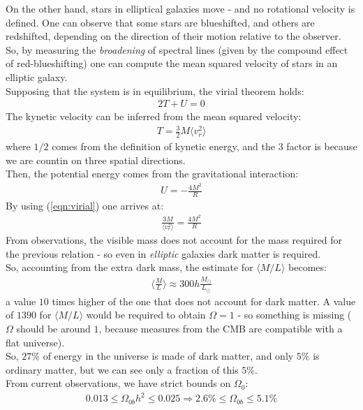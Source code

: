 \documentclass[../PhysUniverse.tex]{subfiles}
\begin{document}
On the other hand, stars in elliptical galaxies move  - and no rotational velocity is defined. One can observe that some stars are blueshifted, and others are redshifted, depending on the direction of their motion relative to the observer. So, by measuring the \textit{broadening} of spectral lines (given by the compound effect of red-blueshifting) one can compute the mean squared velocity of stars in an elliptic galaxy.\\
Supposing that the system is in equilibrium, the virial theorem holds:
\begin{align*}
2T + U = 0
\end{align*}
The kynetic velocity can be inferred from the mean squared velocity:
\begin{align}
T = \frac{3}{2}M \langle v_r^2\rangle
\label{eqn:virial}
\end{align}
where $1/2$ comes from the definition of kynetic energy, and the $3$ factor is because we are countin on three spatial directions.\\
Then, the potential energy comes from the gravitational interaction:
\begin{align*}
U = -\frac{4M^2}{R}
\end{align*}
By using (\ref{eqn:virial}) one arrives at:
\begin{align*}
\frac{3M}{\langle v_r^2\rangle} = \frac{4M^2}{R}
\end{align*}
From observations, the visible mass does not account for the mass required for the previous relation - so even in \textit{elliptic} galaxies dark matter is required.\\

So, accounting from the extra dark mass, the estimate for $\langle M/L\rangle $ becomes:
\begin{align*}
\langle \frac{M}{L}\rangle \approx 300h \frac{M_\odot}{L_\odot}
\end{align*}
a value $10$ times higher of the one that does not account for dark matter. A value of $1390$ for $\langle M/L\rangle$ would be required to obtain $\Omega=1$ - so something is missing ($\Omega$ should be around $1$, because measures from the CMB are compatible with a flat universe).\\

So, $27\%$ of energy in the universe is made of dark matter, and only $5\%$ is ordinary matter, but we can see only a fraction of this $5\%$.\\

From current observations, we have strict bounds on $\Omega_0$:
\begin{align*}
0.013 \leq \Omega_{0b} h^2 \leq 0.025 \Rightarrow 2.6\% \leq \Omega_{0b} \leq 5.1\%
\end{align*}
\end{document}
